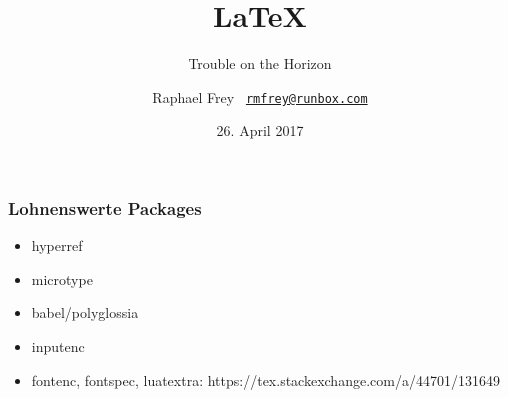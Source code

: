 \documentclass{beamer}                %
\title{\vspace*{4em}\Huge\LaTeX}
\subtitle{\hfill Trouble on the Horizon}
\date{26. April 2017}
\author{%
    Raphael Frey%
    \hfill%
    \scriptsize\texttt{%
        \href{mailto:rmfrey@runbox.com}%
        {rmfrey@runbox.com}}}
\begin{document}
                                                              

\frame[plain]{\titlepage} %





\begin{frame} %
    \frametitle{Lohnenswerte Packages}
    \begin{itemize}
        \item hyperref
        \item microtype
        \item babel/polyglossia
        \item inputenc
        \item fontenc, fontspec, luatextra: https://tex.stackexchange.com/a/44701/131649
    \end{itemize}
\end{frame}
\end{document}
